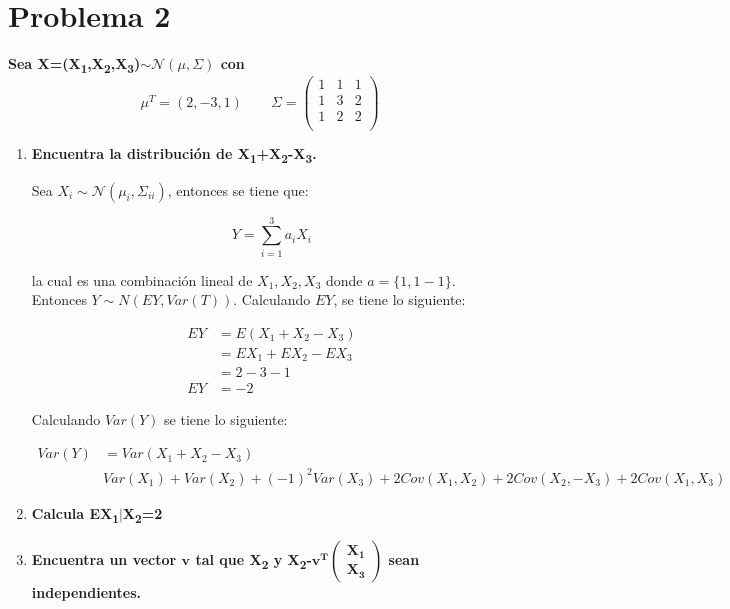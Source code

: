 \section*{Problema 2}

\textbf{Sea X=(X\textsubscript{1},X\textsubscript{2},X\textsubscript{3})$\sim \mathcal{N}(\mu , \Sigma)$ con}
\begin{equation*}
    \mu^T = (2,-3,1) \qquad \Sigma = \begin{pmatrix}
        1 & 1 & 1 \\
        1 & 3 & 2 \\
        1 & 2 & 2 \\
    \end{pmatrix}
\end{equation*}
\begin{enumerate}
    \item \textbf{Encuentra la distribución de X\textsubscript{1}+X\textsubscript{2}-X\textsubscript{3}.}

          Sea $X_i \sim \mathcal{N}(\mu_i,\Sigma_{ii})$, entonces se tiene que:

          \begin{equation*}
              Y = \sum_{i=1}^3 a_i X_i
          \end{equation*}

          la cual es una combinación lineal de $X_1,X_2,X_3$ donde $a=\{1,1-1\}$. Entonces $Y \sim N(EY,Var(T))$. Calculando $EY$, se tiene lo siguiente:

          \begin{align*}
              EY & = E(X_1 + X_2 -X_3)  \\
                 & = EX_1 + EX_2 - EX_3 \\
                 & = 2 -3 -1            \\
              EY & = -2
          \end{align*}

          Calculando $Var(Y)$ se tiene lo siguiente:

          \begin{align*}
              Var(Y) & = Var(X_1 + X_2 - X_3)                                                              \\
                     & Var(X_1) + Var(X_2) + (-1)^2Var(X_3) +2Cov(X_1,X_2) +2Cov(X_2,-X_3) + 2Cov(X_1,X_3)
          \end{align*}
    \item \textbf{Calcula EX\textsubscript{1}$|$X\textsubscript{2}=2}
    \item \textbf{Encuentra un vector $\mathbf{v}$ tal que X\textsubscript{2} y X\textsubscript{2}-$\mathbf{v^T \begin{pmatrix} X_1 \\ X_3 \end{pmatrix}}$ sean independientes.}
\end{enumerate}